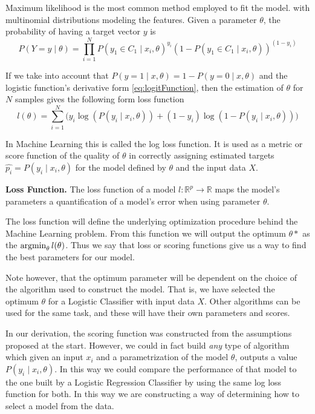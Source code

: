 Maximum likelihood is the most common method employed to fit the model.
with multinomial distributions modeling the features.
Given a parameter $\theta$, the probability of having a target vector $y$ is
\begin{equation}
P(Y =y \mid \theta ) = \prod_{i=1}^N {P(y_1 \in C_1 \mid x_i, \theta)}^{y_i} {(1 - P(y_1 \in C_1 \mid x_i, \theta) )}^{(1-y_i)}
\end{equation}

If we take into account that $P(y=1 \mid x,\theta) = 1 - P(y=0 \mid x,\theta)$ and the logistic function's derivative form \cref{eq:logitFunction}, then the estimation of $\theta$ for $N$ samples gives the following form
loss function
\begin{equation}
l(\theta) = \sum_{i=1}^N \big(y_i \log(P(y_i \mid x_i,\theta)) + (1-y_i)\log(1 - P(y_i \mid x_i,\theta) ) \big)
\label{eq:logLossFunction}
\end{equation}

In Machine Learning this is called the log loss function.
It is used as a metric or score function of the quality of $\theta$ in correctly assigning estimated targets $ {\hat{p_i}} = P(y_i \mid x_i,\theta)$ for the model defined by $\theta$ and the input data $X$.


\begin{definition}{\textbf{Loss Function.}}
The loss function of a model $l: \mathbb{R}^{ p} \rightarrow  \mathbb{R} $ maps the model's parameters a quantification of a model's error when using parameter $\theta$.
\end{definition}

The loss function will define the underlying optimization procedure behind the Machine Learning problem.
From this function we will output the optimum $\theta*$ as the $\operatorname*{argmin}_{\theta} l(\theta) $.
Thus we say that loss or scoring functions give us a way to find the best parameters for our model.

Note however, that the optimum parameter will be dependent on the choice of the algorithm used to construct the model.
That is, we have selected the optimum $\theta$ for a Logistic Classifier with input data $X$.
Other algorithms can be used for the same task, and these will have their own parameters and scores.

In our derivation, the scoring function was constructed from the assumptions proposed at the start.
However, we could in fact build \textit{any} type of algorithm which given an input $x_i$ and a parametrization of the model $\theta$, outputs a value $P(y_i \mid x_i,\theta)$.
In this way we could compare the performance of that model to the one built by a Logistic Regression Classifier by using the same log loss function for both.
In this way we are constructing a way of determining how to select a model from the data.

